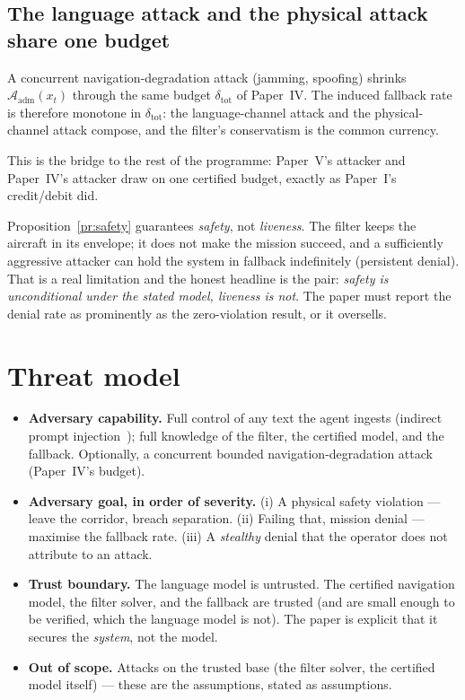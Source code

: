 \documentclass[11pt,a4paper]{article}
\newcommand{\adm}{\mathcal A_{\mathrm{adm}}}
\begin{document}
\subsection{The language attack and the physical attack share one budget}
\begin{proposition}
\label{pr:compose}
A concurrent navigation-degradation attack (jamming, spoofing) shrinks
$\adm(x_t)$ through the same budget $\delta_{\mathrm{tot}}$ of
Paper~IV. The induced fallback rate is therefore monotone in
$\delta_{\mathrm{tot}}$: the language-channel attack and the physical-channel
attack compose, and the filter's conservatism is the common currency.
\end{proposition}
\noindent
This is the bridge to the rest of the programme: Paper~V's attacker and
Paper~IV's attacker draw on one certified budget, exactly as Paper~I's
credit/debit did.

\begin{honestly}
Proposition~\ref{pr:safety} guarantees \emph{safety}, not \emph{liveness}. The
filter keeps the aircraft in its envelope; it does not make the mission succeed,
and a sufficiently aggressive attacker can hold the system in fallback
indefinitely (persistent denial). That is a real limitation and the honest
headline is the pair: \emph{safety is unconditional under the stated model,
liveness is not}. The paper must report the denial rate as prominently as the
zero-violation result, or it oversells.
\end{honestly}

\section{Threat model}
\begin{itemize}
\item \textbf{Adversary capability.} Full control of any text the agent ingests
  (indirect prompt injection~\cite{greshake2023injection}); full knowledge of
  the filter, the certified model, and the fallback. Optionally, a concurrent
  bounded navigation-degradation attack (Paper~IV's budget).
\item \textbf{Adversary goal, in order of severity.} (i) A physical safety
  violation --- leave the corridor, breach separation. (ii) Failing that,
  mission denial --- maximise the fallback rate. (iii) A \emph{stealthy} denial
  that the operator does not attribute to an attack.
\item \textbf{Trust boundary.} The language model is untrusted. The certified
  navigation model, the filter solver, and the fallback are trusted (and are
  small enough to be verified, which the language model is not). The paper is
  explicit that it secures the \emph{system}, not the model.
\item \textbf{Out of scope.} Attacks on the trusted base (the filter solver, the
  certified model itself) --- these are the assumptions, stated as assumptions.
\end{itemize}
\end{document}
